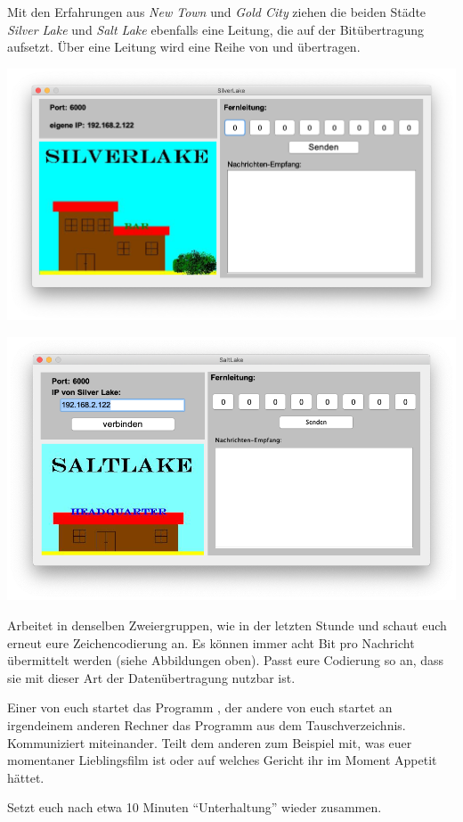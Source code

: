 \documentclass[10pt, a4paper]{arbeitsblatt}
\begin{document}
\ReiheTitel

Mit den Erfahrungen aus \emph{New Town} und \emph{Gold City} ziehen die beiden Städte \emph{Silver Lake} und \emph{Salt Lake} ebenfalls eine Leitung, die auf der Bitübertragung aufsetzt. Über eine Leitung wird eine Reihe von  und  übertragen.

\begin{multicols}{2}\centering
	\includegraphics[width=.9\columnwidth]{Q2-GK-AB.II.2-Abb_Silver Lake.png}

	\includegraphics[width=.9\columnwidth]{Q2-GK-AB.II.2-Abb_Saltlake.png}
\end{multicols}

\begin{aufgabe}
	Arbeitet in denselben Zweiergruppen, wie in der letzten Stunde und schaut euch erneut eure Zeichencodierung an. Es können immer acht Bit pro Nachricht übermittelt werden (siehe Abbildungen oben). Passt eure Codierung so an, dass sie mit dieser Art der Datenübertragung nutzbar ist.
\end{aufgabe}

\begin{aufgabe}
	Einer von euch startet das Programm , der andere von euch startet an irgendeinem anderen Rechner das Programm  aus dem Tauschverzeichnis. Kommuniziert miteinander. Teilt dem anderen zum Beispiel mit, was euer momentaner Lieblingsfilm ist oder auf welches Gericht ihr im Moment Appetit hättet.

	Setzt euch nach etwa 10 Minuten \enquote{Unterhaltung} wieder zusammen.
\end{aufgabe}
\end{document}
